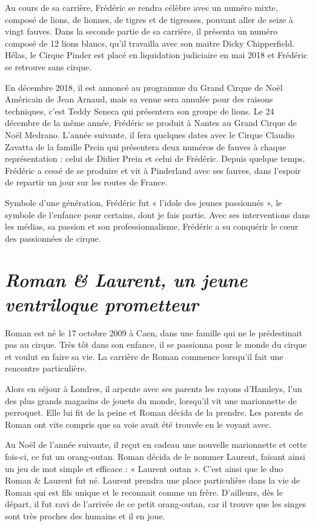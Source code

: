 Au cours de sa carrière, Frédéric se rendra célèbre avec un numéro mixte, composé de lions, de lionnes, de tigres et de tigresses, pouvant aller de seize à vingt fauves. Dans la seconde partie de sa carrière, il présenta un numéro composé de 12 lions blancs, qu'il travailla avec son maitre Dicky Chipperfield. Hélas, le Cirque Pinder est placé en liquidation judiciaire en mai 2018 et Frédéric se retrouve sans cirque.

En décembre 2018, il est annoncé au programme du Grand Cirque de Noël Américain de Jean Arnaud, mais sa venue sera annulée pour des raisons techniques, c’est Teddy Seneca qui présentera son groupe de lions. Le 24 décembre de la même année, Frédéric se produit à Nantes au Grand Cirque de Noël Medrano. L’année suivante, il fera quelques dates avec le Cirque Claudio Zavatta de la famille Prein qui présentera deux numéros de fauves à chaque représentation : celui de Didier Prein et celui de Frédéric. Depuis quelque temps, Frédéric a cessé de se produire et vit à Pinderland avec ses fauves, dans l’espoir de repartir un jour sur les routes de France.

Symbole d’une génération, Frédéric fut « l’idole des jeunes passionnés », le symbole de l’enfance pour certains, dont je fais partie. Avec ses interventions dans les médias, sa passion et son professionnalisme, Frédéric a su conquérir le cœur des passionnées de cirque. 

\section*{\texorpdfstring{\textit{Roman \& Laurent, un jeune ventriloque prometteur}}{Roman et Laurent, un jeune ventriloque prometteur}}
{}

Roman est né le 17 octobre 2009 à Caen, dans une famille qui ne le prédestinait pas au cirque. Très tôt dans son enfance, il se passionna pour le monde du cirque et voulut en faire sa vie. La carrière de Roman commence lorsqu’il fait une rencontre particulière.

Alors en séjour à Londres, il arpente avec ses parents les rayons d’Hamleys, l’un des plus grands magasins de jouets du monde, lorsqu’il vit une marionnette de perroquet. Elle lui fit de la peine et Roman décida de la prendre. Les parents de Roman ont vite compris que sa voie avait été trouvée en le voyant avec.

Au Noël de l’année suivante, il reçut en cadeau une nouvelle marionnette et cette fois-ci, ce fut un orang-outan. Roman décida de le nommer Laurent, faisant ainsi un jeu de mot simple et efficace : « Laurent outan ». C’est ainsi que le duo Roman \& Laurent fut né. Laurent prendra une place particulière dans la vie de Roman qui est fils unique et le reconnait comme un frère. D’ailleurs, dès le départ, il fut ravi de l’arrivée de ce petit orang-outan, car il trouve que les singes sont très proches des humains et il en joue.

